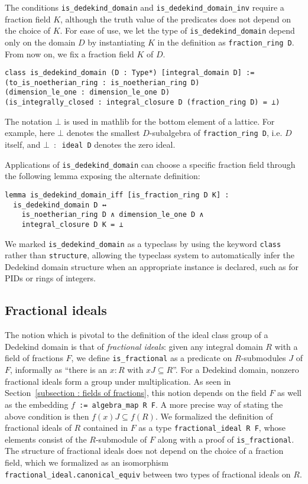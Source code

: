 \documentclass[sn-mathphys]{sn-jnl}%
\newcommand{\lean}[1]{\texttt{#1}\xspace}
\newcommand{\mathlib}{\textsf{mathlib}\xspace}
\begin{document}
The conditions \lean{is\_dedekind\_domain} and \lean{is\_dedekind\_domain\_inv} require a fraction field $K$,
although the truth value of the predicates does not depend on the choice of $K$.
For ease of use, we let the type of \lean{is\_dedekind\_domain} depend only on the domain $D$
by instantiating $K$ in the definition as \lean{fraction\-\_ring D}. From now on, we fix a fraction field $K$ of $D$.
\begin{lstlisting}
class is_dedekind_domain (D : Type*) [integral_domain D] :=
(to_is_noetherian_ring : is_noetherian_ring D)
(dimension_le_one : dimension_le_one D)
(is_integrally_closed : integral_closure D (fraction_ring D) = ⊥)
\end{lstlisting}
The notation $\bot$ is used in \mathlib for the bottom element of a lattice.
For example, here $\bot$ denotes the smallest $D$-subalgebra of \lean{fraction\_ring D}, i.e. $D$ itself,
and \lean{$\bot$ $:$ ideal D} denotes the zero ideal.

Applications of \lean{is\_dedekind\_domain} can choose a specific fraction field through the following lemma exposing the alternate definition:
\begin{lstlisting}
lemma is_dedekind_domain_iff [is_fraction_ring D K] :
  is_dedekind_domain D ↔
    is_noetherian_ring D ∧ dimension_le_one D ∧
    integral_closure D K = ⊥
\end{lstlisting}

We marked \lean{is\_dedekind\_domain} as a typeclass by using the keyword \lean{class} rather than \lean{structure},
allowing the typeclass system to automatically infer the Dedekind domain structure when an appropriate instance is declared, such as for PIDs or rings of integers.

\subsection{Fractional ideals}\label{subsection:frac_ideals}
The notion which is pivotal to the definition of the ideal class group of a Dedekind domain is that of \emph{fractional ideals}:
given any integral domain $R$ with a field of fractions $F$,
we define \lean{is\_fractional} as a predicate on $R$-submodules $J$ of $F$, informally as ``there is an $x : R$ with $x J \subseteq R$''.
For a Dedekind domain, nonzero fractional ideals form a group under multiplication.
As seen in Section~\ref{subsection : fields of fractions}, this notion depends on the field $F$ as well as the embedding \lean{$f$ := algebra\_map R F}.
A more precise way of stating the above condition is then
$f(x)J\subseteq f(R)$.
We formalized the definition of fractional ideals of $R$ contained in $F$ as a type \lean{fractional\_ideal R F}, whose elements consist of the $R$-submodule of $F$ along with a proof of \lean{is\_fractional}.
The structure of fractional ideals does not depend on the choice of a fraction field,
which we formalized as an isomorphism \lean{fractional\_ideal.canonical\_equiv} between two types of fractional ideals on $R$.
\end{document}
